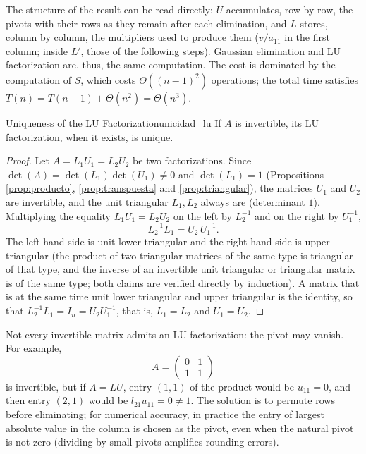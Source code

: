 \documentclass[11pt, a4paper]{article}
\begin{document}
The structure of the result can be read directly: $U$ accumulates, row by row, the pivots with their rows as they remain after each elimination, and $L$ stores, column by column, the multipliers used to produce them ($v / a_{11}$ in the first column; inside $L'$, those of the following steps). Gaussian elimination and LU factorization are, thus, the same computation. The cost is dominated by the computation of $S$, which costs $\Theta((n-1)^2)$ operations; the total time satisfies $T(n) = T(n-1) + \Theta(n^2) = \Theta(n^3)$.

\begin{teorema}{Uniqueness of the LU Factorization}{unicidad_lu}
If $A$ is invertible, its LU factorization, when it exists, is unique.
\end{teorema}

\begin{proof}
Let $A = L_1 U_1 = L_2 U_2$ be two factorizations. Since $\det(A) = \det(L_1) \det(U_1) \neq 0$ and $\det(L_1) = 1$ (Propositions \ref{prop:producto}, \ref{prop:transpuesta} and \ref{prop:triangular}), the matrices $U_1$ and $U_2$ are invertible, and the unit triangular $L_1, L_2$ always are (determinant $1$). Multiplying the equality $L_1 U_1 = L_2 U_2$ on the left by $L_2^{-1}$ and on the right by $U_1^{-1}$,
\[
L_2^{-1} L_1 = U_2 \, U_1^{-1}.
\]
The left-hand side is unit lower triangular and the right-hand side is upper triangular (the product of two triangular matrices of the same type is triangular of that type, and the inverse of an invertible unit triangular or triangular matrix is of the same type; both claims are verified directly by induction). A matrix that is at the same time unit lower triangular and upper triangular is the identity, so that $L_2^{-1} L_1 = I_n = U_2 U_1^{-1}$, that is, $L_1 = L_2$ and $U_1 = U_2$.
\end{proof}

Not every invertible matrix admits an LU factorization: the pivot may vanish. For example,
\[
A = \begin{pmatrix} 0 & 1 \\ 1 & 1 \end{pmatrix}
\]
is invertible, but if $A = LU$, entry $(1,1)$ of the product would be $u_{11} = 0$, and then entry $(2,1)$ would be $l_{21} u_{11} = 0 \neq 1$. The solution is to permute rows before eliminating; for numerical accuracy, in practice the entry of largest absolute value in the column is chosen as the pivot, even when the natural pivot is not zero (dividing by small pivots amplifies rounding errors).
\end{document}
